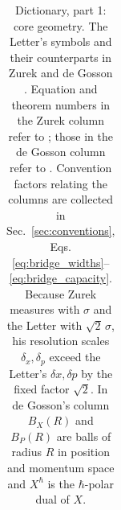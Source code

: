 \documentclass[%
  aps, amsmath, amssymb, onecolumn, 11pt
]{revtex4-2}
\begin{document}
\begin{table}[ht]
\begin{tabular}{@{}p{0.30\linewidth} p{0.28\linewidth} p{0.34\linewidth}@{}}
\bottomrule
\end{tabular}
\caption{Dictionary, part 1: core geometry. The Letter's symbols and their
counterparts in Zurek \cite{zurek2001} and de Gosson
\cite{degosson2024reconstruction, degosson2022polar, degosson2013qblobs}.
Equation and theorem numbers in the Zurek column refer to \cite{zurek2001};
those in the de Gosson column refer to \cite{degosson2024reconstruction}.
Convention factors relating the columns are collected in
Sec.~\ref{sec:conventions}, Eqs.
\eqref{eq:bridge_widths}--\eqref{eq:bridge_capacity}. Because Zurek
measures with $\sigma$ and the Letter with $\sqrt{2}\,\sigma$, his
resolution scales $\delta_x,\delta_p$ exceed the Letter's
$\delta x,\delta p$ by the fixed factor $\sqrt{2}$. In de Gosson's column
$B_X(R)$ and $B_P(R)$ are balls of radius $R$ in position and momentum
space and $X^\hbar$ is the $\hbar$-polar dual of $X$.}
\label{tab:dict_core}
\end{table}
\end{document}
